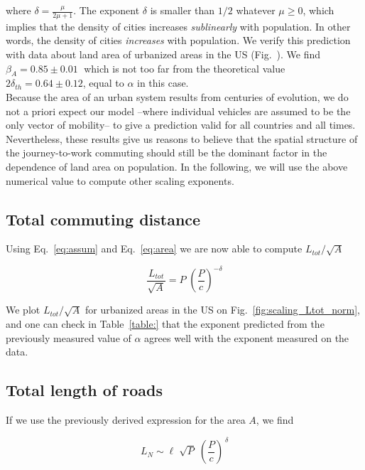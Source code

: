 where $\delta=\frac{\mu}{2\mu+1}$. The exponent $\delta$ is smaller than $1/2$
whatever $\mu\geq 0$, which implies that the density of cities increases
\emph{sublinearly} with population. In other words, the density of cities
\emph{increases}  with population. We verify this prediction with
data about land area of urbanized areas in the US (Fig.~\cite{fig:scaling_area}). We find
$\beta_A = 0.85 \pm 0.01\;$ which is not too far from the
theoretical value $2\delta_{th} = 0.64 \pm 0.12$, equal to
$\alpha$ in this case.\\

Because the area of an urban system results from centuries of evolution, we do
not a priori expect our model --where individual vehicles are assumed to be the
only vector of mobility-- to give a prediction valid for all countries and all
times. Nevertheless, these results give us reasons to believe that the spatial
structure of the journey-to-work commuting should still be the dominant factor
in the dependence of land area on population. In the following, we will use the
above numerical value to compute other scaling exponents.


\subsection{Total commuting distance}

Using Eq.~\ref{eq:assum} and Eq.~\ref{eq:area} we are now able to compute $L_{tot}/\sqrt{A}$

\begin{equation}
    \frac{L_{tot}}{\sqrt{A}} = P\; \left(\frac{P}{c}\right)^{-\delta}
    \label{eq:travelled_length}
\end{equation}

We plot $L_{tot} / \sqrt{A}$ for urbanized areas in the US on
Fig.~\ref{fig:scaling_Ltot_norm}, and one
can check in Table~\ref{table:} that the exponent predicted from the previously measured
value of $\alpha$ agrees well with the exponent measured on the data.


\subsection{Total length of roads}

If we use the previously derived expression for the area $A$, we find

\begin{equation}
    L_N \sim \ell \; \sqrt{P}\; \left(\frac{P}{c}\right)^{\,\delta}
\end{equation}

